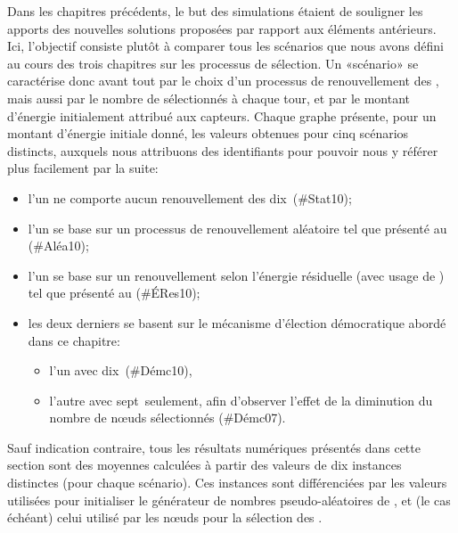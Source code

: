\newcommand\idstat{\textsf{\#Stat10}\xspace}
\newcommand\idrand{\textsf{\#Aléa10}\xspace}
\newcommand\ideres{\textsf{\#ÉRes10}\xspace}
\newcommand\iddemx{\textsf{\#Démc10}\xspace}
\newcommand\iddems{\textsf{\#Démc07}\xspace}
Dans les chapitres précédents, le but des simulations étaient de souligner les apports des nouvelles solutions proposées par rapport aux éléments antérieurs.
Ici, l'objectif consiste plutôt à comparer tous les scénarios que nous avons défini au cours des trois chapitres sur les processus de sélection.
Un «scénario» se caractérise donc avant tout par le choix d'un processus de renouvellement des \cns, mais aussi par le nombre de \cns sélectionnés à chaque tour, et par le montant d'énergie initialement attribué aux capteurs.
Chaque graphe présente, pour un montant d'énergie initiale donné, les valeurs obtenues pour cinq scénarios distincts, auxquels nous attribuons des identifiants pour pouvoir nous y référer plus facilement par la suite:
\begin{itemize}
    \item l'un ne comporte aucun renouvellement des dix~\cns (\idstat);
    \item l'un se base sur un processus de renouvellement aléatoire tel que présenté au  (\idrand);
    \item l'un se base sur un renouvellement selon l'énergie résiduelle (avec usage de \vns) tel que présenté au  (\ideres);
    \item les deux derniers se basent sur le mécanisme d'élection démocratique abordé dans ce chapitre:
        \begin{itemize}
            \item l'un avec dix~\cns (\iddemx),
            \item l'autre avec sept~\cns seulement, afin d'observer l'effet de la diminution du nombre de nœuds sélectionnés (\iddems).
        \end{itemize}
\end{itemize}
Sauf indication contraire, tous les résultats numériques présentés dans cette section sont des moyennes calculées à partir des valeurs de dix instances distinctes (pour chaque scénario).
Ces instances sont différenciées par les valeurs utilisées pour initialiser le générateur de nombres pseudo-aléatoires de \nsii, et (le cas échéant) celui utilisé par les nœuds pour la sélection des \cns.

